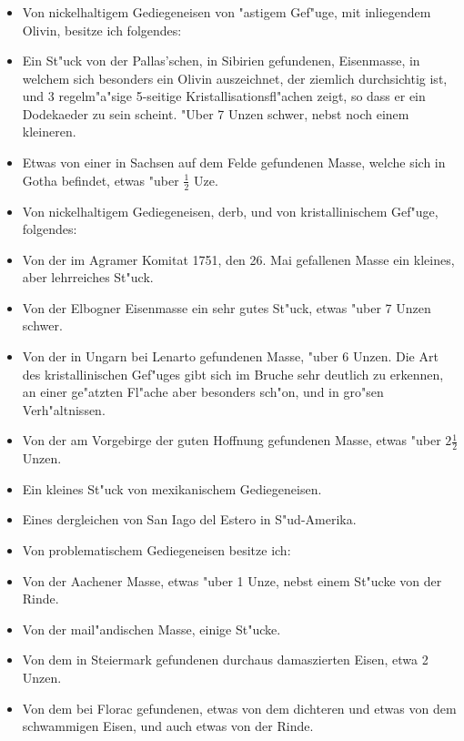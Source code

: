 \documentclass[a4paper, 11pt, oneside, polutonikogreek, german]{article}
\begin{document}
\subsubsection*{}
\begin{itemize}
    \item Von nickelhaltigem Gediegeneisen von "astigem Gef"uge, mit inliegendem Olivin, besitze ich folgendes:
    \item Ein St"uck von der Pallas'schen, in Sibirien gefundenen, Eisenmasse, in welchem sich besonders ein Olivin auszeichnet, der ziemlich durchsichtig ist, und 3 regelm"a"sige 5-seitige Kristallisationsfl"achen zeigt, so dass er ein Dodekaeder zu sein scheint. "Uber 7 Unzen schwer, nebst noch einem kleineren.
    \item Etwas von einer in Sachsen auf dem Felde gefundenen Masse, welche sich in Gotha befindet, etwas "uber $\mathfrak{\frac{1}{2}}$ Uze.
    \item Von nickelhaltigem Gediegeneisen, derb, und von kristallinischem Gef"uge, folgendes:
    \item Von der im Agramer Komitat 1751, den 26. Mai gefallenen Masse ein kleines, aber lehrreiches St"uck.
    \item Von der Elbogner Eisenmasse ein sehr gutes St"uck, etwas "uber 7 Unzen schwer.
    \item Von der in Ungarn bei Lenarto gefundenen Masse, "uber 6 Unzen. Die Art des kristallinischen Gef"uges gibt sich im Bruche sehr deutlich zu erkennen, an einer ge"atzten Fl"ache aber besonders sch"on, und in gro"sen Verh"altnissen.
    \item Von der am Vorgebirge der guten Hoffnung gefundenen Masse, etwas "uber $\mathfrak{2\frac{1}{2}}$ Unzen.
    \item Ein kleines St"uck von mexikanischem Gediegeneisen.
    \item Eines dergleichen von San Iago del Estero in S"ud-Amerika.
    \item Von problematischem Gediegeneisen besitze ich:
    \item Von der Aachener Masse, etwas "uber 1 Unze, nebst einem St"ucke von der Rinde.
    \item Von der mail"andischen Masse, einige St"ucke.
    \item Von dem in Steiermark gefundenen durchaus damaszierten Eisen, etwa 2 Unzen.
    \item Von dem bei Florac gefundenen, etwas von dem dichteren und etwas von dem schwammigen Eisen, und auch etwas von der Rinde.
\end{itemize}
\end{document}
